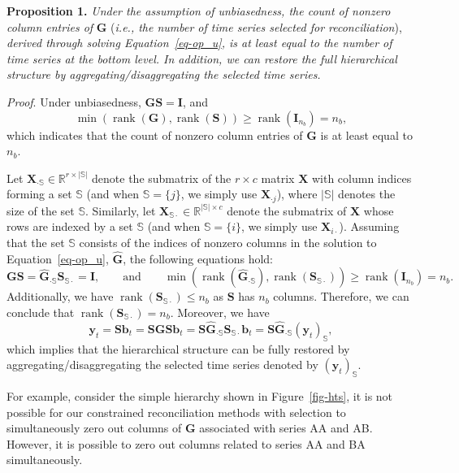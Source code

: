 \documentclass[
  11pt]{article}
\begin{document}
\textbf{Proposition 1.} \emph{Under the assumption of unbiasedness, the
count of nonzero column entries of} \(\bm{G}\) (\emph{i.e., the number
of time series selected for reconciliation}), \emph{derived through
solving Equation~\ref{eq-op_u}, is at least equal to the number of time
series at the bottom level. In addition, we can restore the full
hierarchical structure by aggregating/disaggregating the selected time
series.}

\emph{Proof}. Under unbiasedness, \(\bm{G}\bm{S}=\bm{I}\), and \[
\min \left(\operatorname{rank}(\bm{G}), \operatorname{rank}(\bm{S})\right) \geq \operatorname{rank}(\bm{I}_{n_b})=n_b,
\] which indicates that the count of nonzero column entries of
\(\bm{G}\) is at least equal to \(n_b\).

Let \(\bm{X}_{\cdot \mathbb{S}} \in \mathbb{R}^{r \times |\mathbb{S}|}\)
denote the submatrix of the \(r \times c\) matrix \(\bm{X}\) with column
indices forming a set \(\mathbb{S}\) (and when \(\mathbb{S} = \{j\}\),
we simply use \(\bm{X}_{\cdot j}\)), where \(|\mathbb{S}|\) denotes the
size of the set \(\mathbb{S}\). Similarly, let
\(\bm{X}_{\mathbb{S}\cdot} \in \mathbb{R}^{|\mathbb{S}| \times c}\)
denote the submatrix of \(\bm{X}\) whose rows are indexed by a set
\(\mathbb{S}\) (and when \(\mathbb{S} = \{i\}\), we simply use
\(\bm{X}_{i\cdot}\)). Assuming that the set \(\mathbb{S}\) consists of
the indices of nonzero columns in the solution to
Equation~\ref{eq-op_u}, \(\hat{\bm{G}}\), the following equations hold:
\[
\bm{G}\bm{S} = \hat{\bm{G}}_{\cdot \mathbb{S}}\bm{S}_{\mathbb{S}\cdot} = \bm{I},
\qquad\text{and}\qquad
\min \left(\operatorname{rank}(\hat{\bm{G}}_{\cdot \mathbb{S}}), \operatorname{rank}(\bm{S}_{\mathbb{S}\cdot})\right) \geq \operatorname{rank}(\bm{I}_{n_b})=n_b.
\] Additionally, we have
\(\operatorname{rank}(\bm{S}_{\mathbb{S}\cdot}) \leq n_b\) as \(\bm{S}\)
has \(n_b\) columns. Therefore, we can conclude that
\(\operatorname{rank}(\bm{S}_{\mathbb{S}\cdot}) = n_b\). Moreover, we
have \[
\bm{y}_t = \bm{S}\bm{b}_t = \bm{S}\bm{G}\bm{S}\bm{b}_t=\bm{S}\hat{\bm{G}}_{\cdot\mathbb{S}}\bm{S}_{\mathbb{S}\cdot}\bm{b}_t=\bm{S}\hat{\bm{G}}_{\cdot \mathbb{S}}(\bm{y}_t)_{\mathbb{S}},
\] which implies that the hierarchical structure can be fully restored
by aggregating/disaggregating the selected time series denoted by
\((\bm{y}_{t})_{\mathbb{S}}\).

For example, consider the simple hierarchy shown in
Figure~\ref{fig-hts}, it is not possible for our constrained
reconciliation methods with selection to simultaneously zero out columns
of \(\bm{G}\) associated with series AA and AB. However, it is possible
to zero out columns related to series AA and BA simultaneously.
\end{document}
